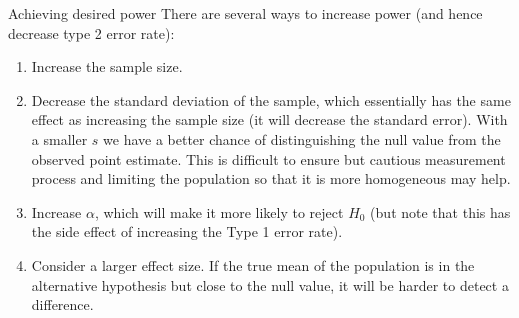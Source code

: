 \documentclass[
  ignorenonframetext,
]{beamer}
\begin{document}
\begin{frame}{Achieving desired power}
\protect\hypertarget{achieving-desired-power}{}
There are several ways to increase power (and hence decrease type 2
error rate):

\pause

\begin{enumerate}

\item Increase the sample size.

\pause

\item Decrease the standard deviation of the sample, which essentially has the same effect as increasing the sample size (it will decrease the standard error). With a smaller $s$ we have a better chance of distinguishing the null value from the observed point estimate. This is difficult to ensure but cautious measurement process and limiting the population so that it is more homogeneous may help.

\pause

\item Increase $\alpha$, which will make it more likely to reject $H_0$ (but note that this has the side effect of increasing the Type 1 error rate).

\pause

\item Consider a larger effect size. If the true mean of the population is in the alternative hypothesis but close to the null value, it will be harder to detect a difference.

\end{enumerate}
\end{frame}
\end{document}
